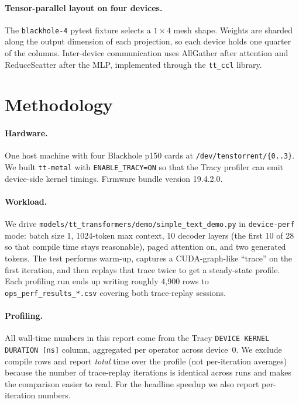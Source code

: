 \documentclass[sigplan,nonacm]{acmart}
\newcommand{\code}[1]{\texttt{\nolinkurl{#1}}}
\begin{document}
\paragraph{Tensor-parallel layout on four devices.} The
\texttt{blackhole-4} pytest fixture selects a $1{\times}4$ mesh
shape. Weights are sharded along the output dimension of each
projection, so each device holds one quarter of the columns. Inter-device
communication uses AllGather after attention and ReduceScatter after
the MLP, implemented through the \texttt{tt\_ccl} library.

\section{Methodology}

\paragraph{Hardware.} One host machine with four Blackhole p150 cards
at \texttt{/dev/tenstorrent/\{0..3\}}. We built \texttt{tt-metal}
with \texttt{ENABLE\_TRACY=ON} so that the Tracy profiler can emit
device-side kernel timings. Firmware bundle version 19.4.2.0.

\paragraph{Workload.} We drive
\code{models/tt_transformers/demo/simple_text_demo.py} in
\texttt{device-perf} mode: batch size 1, 1024-token max context,
10 decoder layers (the first 10 of 28 so that compile time stays
reasonable), paged attention on, and two generated tokens. The test
performs warm-up, captures a CUDA-graph-like ``trace'' on the first
iteration, and then replays that trace twice to get a steady-state
profile. Each profiling run ends up writing roughly 4{,}900 rows to
\texttt{ops\_perf\_results\_*.csv} covering both trace-replay
sessions.

\paragraph{Profiling.} All wall-time numbers in this report come from
the Tracy \texttt{DEVICE KERNEL DURATION [ns]} column, aggregated per
operator across device~0. We exclude compile rows and report
\emph{total} time over the profile (not per-iteration averages)
because the number of trace-replay iterations is identical across runs
and makes the comparison easier to read. For the headline speedup we
also report per-iteration numbers.
\end{document}
